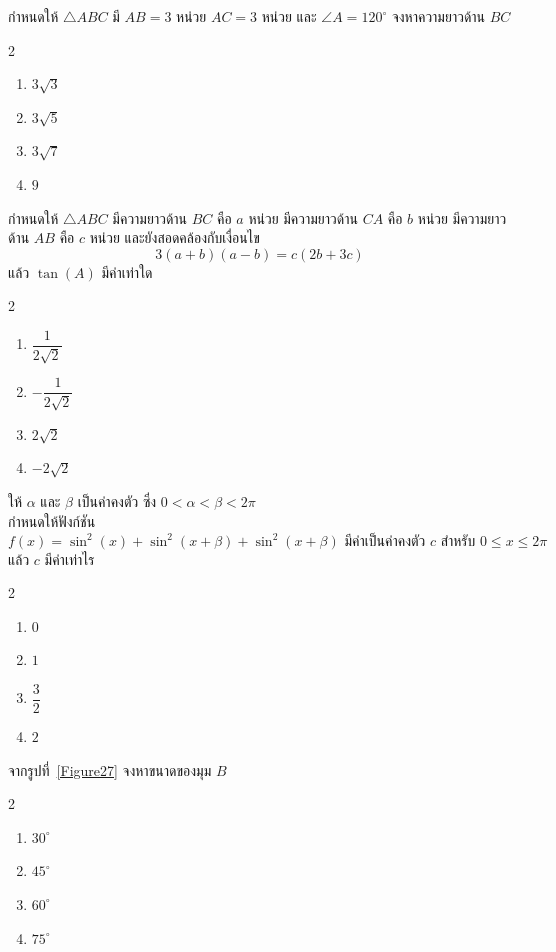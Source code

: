 \begin{examplebox}  
กำหนดให้ $\triangle ABC$ มี $AB=3$ หน่วย $AC=3$ หน่วย และ $\angle A =120^{\circ}$ จงหาความยาวด้าน $BC$
\begin{multicols}{2}
\begin{enumerate}
\item $3\sqrt{3}$
\item $3\sqrt{5}$
\item $3\sqrt{7}$
\item $9$
\end{enumerate}
\end{multicols}
\end{examplebox}
\newpage
\begin{examplebox}
กำหนดให้ $\triangle A B C$ มีความยาวด้าน $BC$ คือ $a$ หน่วย มีความยาวด้าน $CA$ คือ $b$ หน่วย มีความยาวด้าน $AB$ คือ $c$ หน่วย และยังสอดคล้องกับเงื่อนไข
\[3(a+b)(a-b)=c(2 b+3 c)\]
แล้ว $\tan(A)$ มีค่าเท่าใด
\begin{multicols}{2}
\begin{enumerate}
\item $\dfrac{1}{2 \sqrt{2}}$
\item $-\dfrac{1}{2 \sqrt{2}}$
\item $2 \sqrt{2}$
\item $-2 \sqrt{2}$
\end{enumerate}
\end{multicols}
\end{examplebox}
\newpage
\begin{examplebox}
ให้ $\alpha$ และ $\beta$ เป็นค่าคงตัว ซึ่ง $0<\alpha<\beta<2\pi$ \\
กำหนดให้ฟังก์ชัน
\[f(x)=\sin^2(x)+\sin^2(x+\beta)+\sin^2(x+\beta)\,\, \text{มีค่าเป็นค่าคงตัว $c$ สำหรับ $0 \leq x \leq 2 \pi$}\]
แล้ว $c$ มีค่าเท่าไร
\begin{multicols}{2}
\begin{enumerate}
\item $0$
\item $1$
\item $\dfrac{3}{2}$
\item $2$
\end{enumerate}
\end{multicols}
\end{examplebox}
\newpage
\begin{examplebox}
จากรูปที่~\ref{Figure27} จงหาขนาดของมุม $B$
\begin{multicols}{2}
\begin{enumerate}
\item $30^{\circ}$
\item $45^{\circ}$
\item $60^{\circ}$
\item $75^{\circ}$
\end{enumerate}
\end{multicols}
\end{examplebox} 
